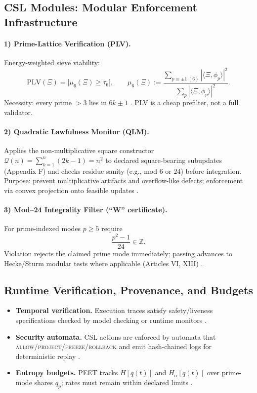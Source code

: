 \documentclass[12pt]{amsart}
\theoremstyle{plain}
\begin{document}
\subsection{CSL Modules: Modular Enforcement Infrastructure}
\paragraph{1) Prime-Lattice Verification (PLV).}
Energy-weighted sieve viability:
\[
\mathrm{PLV}(\Xi)=\big[\mu_6(\Xi)\ge \tau_6\big],\qquad
\mu_6(\Xi):=\frac{\sum_{p\equiv \pm 1\ (6)}|\langle \Xi,\phi_p\rangle|^2}{\sum_{p}|\langle \Xi,\phi_p\rangle|^2}.
\]
Necessity: every prime $>3$ lies in $6k\pm1$ \cite{hardy2008introduction}. PLV is a cheap prefilter, not a full validator.

\paragraph{2) Quadratic Lawfulness Monitor (QLM).}
Applies the non-multiplicative square constructor $\mathcal{Q}(n)=\sum_{k=1}^{n}(2k-1)=n^2$ to declared square-bearing subupdates (Appendix F) and checks residue sanity (e.g., mod $6$ or $24$) before integration. Purpose: prevent multiplicative artifacts and overflow-like defects; enforcement via convex projection onto feasible updates \cite{hardy2008introduction,boyd2004convex}.

\paragraph{3) Mod–24 Integrality Filter (``W'' certificate).}
For prime-indexed modes $p\ge5$ require
\[
\frac{p^2-1}{24}\in\mathbb{Z}.
\]
Violation rejects the claimed prime mode immediately; passing advances to Hecke/Sturm modular tests where applicable (Articles VI, XIII) \cite{hardy2008introductio n,sturm1987congruence,diamond2005first}.

\subsection{Runtime Verification, Provenance, and Budgets}
\begin{itemize}
  \item \textbf{Temporal verification.} Execution traces satisfy safety/liveness specifications checked by model checking or runtime monitors \cite{clarke1999model,baier2008model}.
  \item \textbf{Security automata.} CSL actions are enforced by automata that \textsc{allow}/\textsc{project}/\textsc{freeze}/\textsc{rollback} and emit hash-chained logs for deterministic replay \cite{schneider2000enforceable}.
  \item \textbf{Entropy budgets.} PEET tracks $H[q(t)]$ and $H_\alpha[q(t)]$ over prime-mode shares $q_p$; rates must remain within declared limits \cite{cover2006elements}.
\end{itemize}
\end{document}
